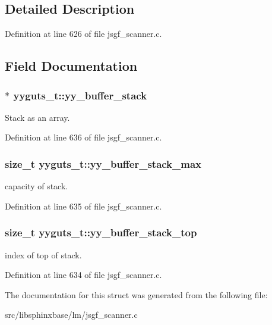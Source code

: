 \subsection{\-Detailed \-Description}


\-Definition at line 626 of file jsgf\-\_\-scanner.\-c.



\subsection{\-Field \-Documentation}
\subsubsection[{yy\-\_\-buffer\-\_\-stack}]{$\ast$ {\bf yyguts\-\_\-t\-::yy\-\_\-buffer\-\_\-stack}}\label{structyyguts__t_ad0b9d576189d518a4482f20ed9b2a416}


\-Stack as an array. 



\-Definition at line 636 of file jsgf\-\_\-scanner.\-c.

\subsubsection[{yy\-\_\-buffer\-\_\-stack\-\_\-max}]{\setlength{\rightskip}{0pt plus 5cm}size\-\_\-t {\bf yyguts\-\_\-t\-::yy\-\_\-buffer\-\_\-stack\-\_\-max}}\label{structyyguts__t_a4435bb91e87f9988b096afc21386289a}


capacity of stack. 



\-Definition at line 635 of file jsgf\-\_\-scanner.\-c.

\subsubsection[{yy\-\_\-buffer\-\_\-stack\-\_\-top}]{\setlength{\rightskip}{0pt plus 5cm}size\-\_\-t {\bf yyguts\-\_\-t\-::yy\-\_\-buffer\-\_\-stack\-\_\-top}}\label{structyyguts__t_af92507d904af2fcd4509acde654a9850}


index of top of stack. 



\-Definition at line 634 of file jsgf\-\_\-scanner.\-c.



\-The documentation for this struct was generated from the following file\-:\begin{DoxyCompactItemize}
\item 
src/libsphinxbase/lm/jsgf\-\_\-scanner.\-c\end{DoxyCompactItemize}
